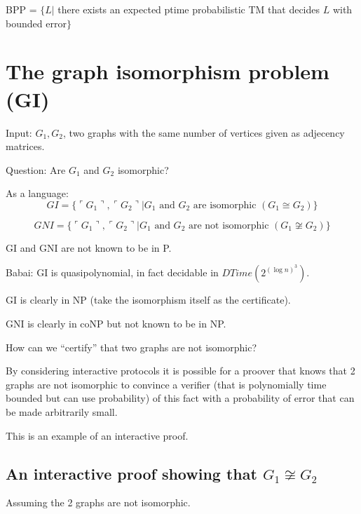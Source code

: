 \documentclass[a4paper,12pt]{article}
\theoremstyle{definition}
\theoremstyle{remark}
\begin{document}
BPP = $\{L | $ there exists an expected ptime probabilistic TM that decides $L$ with bounded error$\}$







\newpage

\section{The graph isomorphism problem (GI)}

Input: $G_1, G_2$, two graphs with the same number of vertices given as adjecency matrices.

Question: Are $G_1$ and $G_2$ isomorphic?

As a language:
\begin{equation*}
    GI = \{\ulcorner G_1 \urcorner, \ulcorner G_2 \urcorner | G_1 \text{ and } G_2 \text{ are isomorphic } (G_1 \cong G_2)\}
\end{equation*}

\begin{equation*}
    GNI = \{\ulcorner G_1 \urcorner, \ulcorner G_2 \urcorner | G_1 \text{ and } G_2 \text{ are not isomorphic } (G_1 \not \cong G_2)\}
\end{equation*}

GI and GNI are not known to be in P.

Babai: GI is quasipolynomial, in fact decidable in $DTime(2^{(\log n)^3})$.

GI is clearly in NP (take the isomorphism itself as the certificate).

GNI is clearly in coNP but not known to be in NP.

How can we ``certify'' that two graphs are not isomorphic?

By considering interactive protocols it is possible for a proover that knows that 2 graphs are not isomorphic to convince a verifier
(that is polynomially time bounded but can use probability) of this fact with a probability of error that can be made arbitrarily small.

This is an example of an interactive proof.

\subsection*{An interactive proof showing that $G_1 \not \cong G_2$}
Assuming the 2 graphs are not isomorphic.
\end{document}
